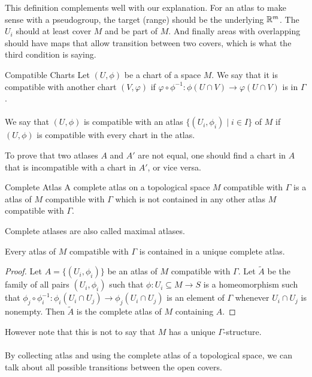 \documentclass[a4paper]{article}
\begin{document}
This definition complements well with our explanation. For an atlas to make sense with a pseudogroup, the target (range) should be the underlying $\mathbb{R}^m$. The $U_i$ should at least cover $M$ and be part of $M$. And finally areas with overlapping should have maps that allow transition between two covers, which is what the third condition is saying. 

\begin{defn}{Compatible Charts}{} Let $(U,\phi)$ be a chart of a space $M$. We say that it is compatible with another chart $(V,\varphi)$ if $\varphi\circ\phi^{-1}:\phi(U\cap V)\to\varphi(U\cap V)$ is in $\Gamma$. \\~\\
We say that $(U,\phi)$ is compatible with an atlas $\{(U_i,\phi_i)\;|\;i\in I\}$ of $M$ if $(U,\phi)$ is compatible with every chart in the atlas. 
\end{defn}

To prove that two atlases $A$ and $A'$ are not equal, one should find a chart in $A$ that is incompatible with a chart in $A'$, or vice versa. 

\begin{defn}{Complete Atlas}{} A complete atlas on a topological space $M$ compatible with $\Gamma$ is a atlas of $M$ compatible with $\Gamma$ which is not contained in any other atlas $M$ compatible with $\Gamma$. 
\end{defn}

Complete atlases are also called maximal atlases. 

\begin{lmm}{}{} Every atlas of $M$ compatible with $\Gamma$ is contained in a unique complete atlas. \tcbline
\begin{proof}
Let $A=\{(U_i,\phi_i)\}$ be an atlas of $M$ compatible with $\Gamma$. Let $\tilde{A}$ be the family of all pairs $(U_i,\phi_i)$ such that $\phi:U_i\subseteq M\to S$ is a homeomorphism such that $\phi_j\circ\phi_i^{-1}:\phi_i(U_i\cap U_j)\to\phi_j(U_i\cap U_j)$ is an element of $\Gamma$ whenever $U_i\cap U_j$ is nonempty. Then $\tilde{A}$ is the complete atlas of $M$ containing $A$. 
\end{proof}
\end{lmm}

However note that this is not to say that $M$ has a unique $\Gamma$-structure. \\~\\

By collecting atlas and using the complete atlas of a topological space, we can talk about all possible transitions between the open covers. 
\end{document}
